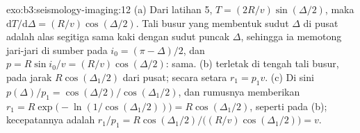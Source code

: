 \begin{solution}{exo:b3:seismology-imaging:12}
(a) Dari latihan 5, $T = (2R/v)\sin(\Delta/2)$, maka $\mathrm dT/\mathrm d\Delta
= (R/v)\cos(\Delta/2)$. Tali busur yang membentuk sudut $\Delta$ di pusat adalah
alas segitiga sama kaki dengan sudut puncak $\Delta$, sehingga ia memotong jari-jari
di sumber pada $i_0 = (\pi - \Delta)/2$, dan $p = R\sin i_0/v =
(R/v)\cos(\Delta/2)$: sama. (b)  terletak di tengah
tali busur, pada jarak $R\cos(\Delta_1/2)$ dari pusat; secara setara
$r_1 = p_1v$. (c) Di sini $p(\Delta)/p_1 = \cos(\Delta/2)/\cos(\Delta_1/2)$, dan
rumusnya memberikan $r_1 = R\exp\bigl(-\ln(1/\cos(\Delta_1/2))\bigr) =
R\cos(\Delta_1/2)$, seperti pada (b); kecepatannya adalah $r_1/p_1 = R\cos(\Delta_1/2)\big/
\bigl((R/v)\cos(\Delta_1/2)\bigr) = v$.
\end{solution}

